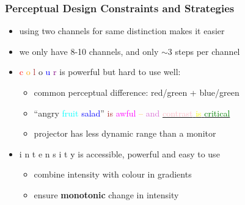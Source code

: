 \documentclass{beamer}
\newcommand{\key}[1]{\textcolor{keyred}{{\bf #1}}}
\newcommand{\theref}{\ensuremath{\dot{.~.}~}}
\begin{document}
\begin{frame}
\frametitle{Perceptual Design Constraints and Strategies}
\begin{itemize}
\item using two channels for same distinction makes it easier
\item we only have 8-10 channels, and only $\sim 3$ steps per channel
\pause
\item
		\textcolor{red}{c}%
		\textcolor{orange}{o}%
		\textcolor{brown}{l}%
		\textcolor{jade}{o}%
		\textcolor{blue}{u}%
		\textcolor{purple}{r} is powerful but hard to use well:
	\begin{itemize}
	\item common perceptual difference: red/green + blue/green
	\item
		``\textcolor{jade}{angry}
		\textcolor{cyan}{fruit}
		\textcolor{blue}{salad}''
		\textcolor{brown}{is}
		\textcolor{magenta}{awful}
		\textcolor{orange}{--}
		\textcolor{orchid}{and}
		\underline{\textcolor{pink}{contrast}
		\textcolor{yellow}{is}
		\textcolor{green}{critical}}
	\item projector has less dynamic range than a monitor
	\end{itemize}
	\pause
\item
	\textcolor{grey1}{i}%
	\textcolor{grey2}{n}%
	\textcolor{grey3}{t}%
	\textcolor{grey4}{e}%
	\textcolor{grey5}{n}%
	\textcolor{grey6}{s}%
	\textcolor{grey7}{i}%
	\textcolor{grey8}{t}%
	\textcolor{black}{y}
	is accessible, powerful and easy to use
	\begin{itemize}
	\item combine intensity with colour in gradients
	\item ensure \key{monotonic} change in intensity
	\end{itemize}
\end{itemize}
\end{frame}
\end{document}
